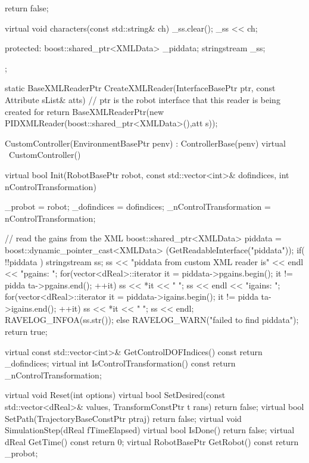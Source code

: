 \begin{DoxyCodeInclude}
{{{            return false;
        }

        virtual void characters(const std::string& ch)
        {
            _ss.clear();
            _ss << ch;
        }

protected:
        boost::shared_ptr<XMLData> _piddata;
        stringstream _ss;
    };

    static BaseXMLReaderPtr CreateXMLReader(InterfaceBasePtr ptr, const Attribute
      sList& atts)
    {
        // ptr is the robot interface that this reader is being created for
        return BaseXMLReaderPtr(new PIDXMLReader(boost::shared_ptr<XMLData>(),att
      s));
    }

    CustomController(EnvironmentBasePtr penv) : ControllerBase(penv)
    {
    }
    virtual ~CustomController() {
    }

    virtual bool Init(RobotBasePtr robot, const std::vector<int>& dofindices, int
       nControlTransformation)
    {
        _probot = robot;
        _dofindices = dofindices;
        _nControlTransformation = nControlTransformation;

        // read the gains from the XML
        boost::shared_ptr<XMLData> piddata = boost::dynamic_pointer_cast<XMLData>
      (GetReadableInterface("piddata"));
        if( !!piddata ) {
            stringstream ss;
            ss << "piddata from custom XML reader is" << endl << "pgains: ";
            for(vector<dReal>::iterator it = piddata->pgains.begin(); it != pidda
      ta->pgains.end(); ++it)
                ss << *it << " ";
            ss << endl << "igains: ";
            for(vector<dReal>::iterator it = piddata->igains.begin(); it != pidda
      ta->igains.end(); ++it)
                ss << *it << " ";
            ss << endl;
            RAVELOG_INFOA(ss.str());
        }
        else
            RAVELOG_WARN("failed to find piddata\n");
        return true;
    }

    virtual const std::vector<int>& GetControlDOFIndices() const {
        return _dofindices;
    }
    virtual int IsControlTransformation() const {
        return _nControlTransformation;
    }

    virtual void Reset(int options) {
    }
    virtual bool SetDesired(const std::vector<dReal>& values, TransformConstPtr t
      rans) {
        return false;
    }
    virtual bool SetPath(TrajectoryBaseConstPtr ptraj) {
        return false;
    }
    virtual void SimulationStep(dReal fTimeElapsed) {
    }
    virtual bool IsDone() {
        return false;
    }
    virtual dReal GetTime() const {
        return 0;
    }
    virtual RobotBasePtr GetRobot() const {
        return _probot;
    }

}
\end{DoxyCodeInclude}
